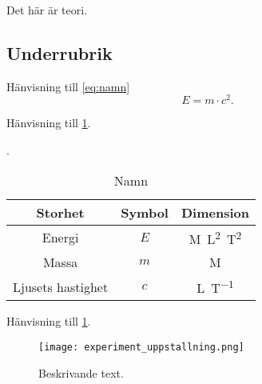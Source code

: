 Det här är teori. %
\subsection{Underrubrik}
Hänvisning till \cref{eq:namn}
\begin{equation} \label{eq:namn}
    E=m \cdot c^2.
\end{equation}

Hänvisning till \cref{tab:namn}.
\begin{table}[H]
\caption{Namn} \label{tab:namn}.
\centering 
    \begin{tabular}{|c|c|c|}
    \hline
    \textbf{Storhet} & \textbf{Symbol} & \textbf{Dimension} \\
     \hline
Energi &  $E$ & \si{M.L^2.T^{2}} \\
    \hline
Massa & $m$ & \si{M} \\
    \hline
Ljusets hastighet & $c$ & \si{L.T^{-1}} \\
    \hline
    \end{tabular} 
\end{table}

Hänvisning till \cref{fig:namn}.
\begin{figure} [H]
    \centering 
    \texttt{[image: experiment\_uppstallning.png]}
    \caption{Beskrivande text.}
    \label{fig:namn}
\end{figure}